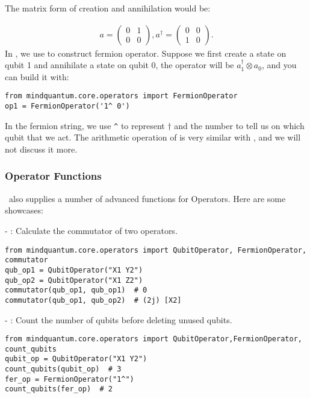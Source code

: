The matrix form of creation and annihilation would be:

\begin{align*}
    a=\begin{pmatrix}
        0 & 1 \\
        0 & 0
    \end{pmatrix},
    a^\dagger=\begin{pmatrix}
        0 & 0 \\
        1 & 0
    \end{pmatrix}.
\end{align*}
In \MindQuantum, we use \FermionOperator to construct fermion operator. Suppose we first create a state on qubit 1 and annihilate a state on qubit 0, the operator will be $a_1^\dagger\otimes a_0$, and you can build it with:
\begin{lstlisting}
from mindquantum.core.operators import FermionOperator
op1 = FermionOperator('1^ 0')
\end{lstlisting}
In the fermion string, we use \verb|^| to represent $\dagger$ and the number to tell us on which qubit that we act. The arithmetic operation of \FermionOperator is very similar with \QubitOperator, and we will not discuss it more.


\subsubsection{Operator Functions}

\MindQuantum\ also supplies a number of advanced functions for Operators. Here are some showcases:

-  : Calculate the commutator of two operators.

\begin{lstlisting}
from mindquantum.core.operators import QubitOperator, FermionOperator, commutator
qub_op1 = QubitOperator("X1 Y2")
qub_op2 = QubitOperator("X1 Z2")
commutator(qub_op1, qub_op1)  # 0
commutator(qub_op1, qub_op2)  # (2j) [X2]
\end{lstlisting}

-  : Count the number of qubits before deleting unused qubits.

\begin{lstlisting}
from mindquantum.core.operators import QubitOperator,FermionOperator, count_qubits
qubit_op = QubitOperator("X1 Y2")
count_qubits(qubit_op)  # 3
fer_op = FermionOperator("1^")
count_qubits(fer_op)  # 2
\end{lstlisting}


